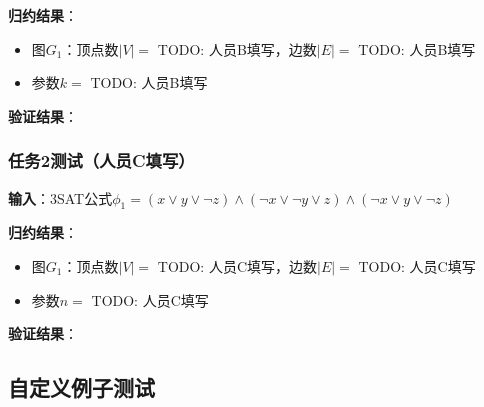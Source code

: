 \documentclass{sysucseexp}
\begin{document}
\textbf{归约结果}：
\begin{itemize}
    \item 图$G_1$：顶点数$|V| = $ TODO: 人员B填写，边数$|E| = $ TODO: 人员B填写
    \item 参数$k = $ TODO: 人员B填写
\end{itemize}


\textbf{验证结果}：

\subsubsection{任务2测试（人员C填写）}

\textbf{输入}：3SAT公式$\phi_1 = (x \lor y \lor \neg z) \land (\neg x \lor \neg y \lor z) \land (\neg x \lor y \lor \neg z)$

\textbf{归约结果}：
\begin{itemize}
    \item 图$G_1$：顶点数$|V| = $ TODO: 人员C填写，边数$|E| = $ TODO: 人员C填写
    \item 参数$n = $ TODO: 人员C填写
\end{itemize}


\textbf{验证结果}：

\subsection{自定义例子测试}

\end{document}
